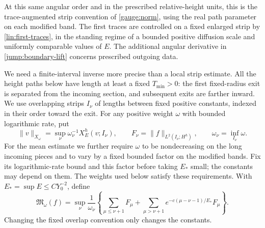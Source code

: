 At this same angular order and in the prescribed relative-height units,
this is the trace-augmented strip convention of \eqref{gauge:norm},
using the real path parameter on each modified band.  The first traces are
controlled on a fixed enlarged strip by \eqref{lin:first-traces},
in the standing regime of a bounded positive diffusion scale and
uniformly comparable values of $E$.  The additional angular derivative
in \eqref{jump:boundary-lift} concerns prescribed outgoing data.

We need a finite-interval inverse more precise than a local strip
estimate.  All the height paths below have length at least a fixed
$T_{\min}>0$: the first fixed-radius exit is separated from the
incoming section, and subsequent exits are farther inward.  We use
overlapping strips $I_\nu$ of lengths between fixed positive
constants, indexed in their order toward the exit.  For any positive
weight $\omega$ with bounded logarithmic rate, put
\[
 \|v\|_{X_\omega}=\sup_\nu\omega_\nu^{-1}X_E^h(v;I_\nu),
 \qquad F_\nu=\|f\|_{L^2(I_\nu;H^h)},\qquad
 \omega_\nu=\inf_{I_\nu}\omega.
\]
For the mean estimate we further require $\omega$ to be
nondecreasing on the long incoming pieces and to vary by a fixed
bounded factor on the modified bands.  Fix its logarithmic-rate bound
and this factor before taking $E_*$ small; the constants
may depend on them.  The weights used below satisfy these
requirements.
With $E_*=\sup E\leq C Y_0^{-2}$, define
\begin{equation}\label{jump:mean-source-norm}
 \mathfrak M_\omega(f)=
 \sup_\nu\frac1{\omega_\nu}
 \left\{\sum_{\mu\leq\nu+1}F_\mu+
 \sum_{\mu>\nu+1}e^{-c(\mu-\nu-1)/E_*}F_\mu\right\}.
\end{equation}
Changing the fixed overlap convention only changes the constants.


